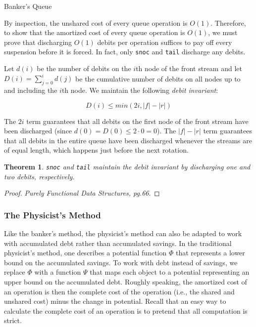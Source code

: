 \documentclass[12pt, a4paper]{article} %
\newtheorem{theorem}{Theorem}[section]     %
\newcommand{\code}[1]{\texttt{#1}} %
\begin{document}
\begin{listing}[H]
  \inputminted[breaklines=true]{haskell}{../../Chapter6/BankersQueue.hs}
  \caption{Banker's Queue}
  \label{lst:banker's queue}
\end{listing}

By inspection, the unshared cost of every queue operation is $O(1)$. Therefore, to show that the amortized cost of every queue operation is $O(1)$, we must prove that discharging $O(1)$ debits per operation suffices to pay off every suspension before it is forced. In fact, only \code{snoc} and \code{tail} discharge any debits.

\newpage

Let $d(i)$ be the number of debits on the $i$th node of the front stream and let $D(i) = \sum_{j = 0}^{i} d(j)$ be the cumulative number of debits on all nodes up to and including the $i$th node. We maintain the following \textit{debit invariant}:

\[
  D(i) \leq min(2i, |f| - |r|)
\]

The $2i$ term guarantees that all debits on the first node of the front stream have been discharged (since $d(0) = D(0) \leq 2 \cdot 0 = 0$). The $|f| - |r|$ term guarantees that all debits in the entire queue have been discharged whenever the streams are of equal length, which happens just before the next rotation.

\begin{theorem}
  \code{snoc} and \code{tail} maintain the debit invariant by discharging one and two debits, respectively.
\end{theorem}

\begin{proof}
  \textit{Purely Functional Data Structures, pg.66}.
\end{proof}

\subsubsection{The Physicist's Method}%

Like the banker's method, the physicist's method can also be adapted to work with accumulated debt rather than accumulated savings. In the traditional physicist's method, one describes a potential function $\Phi$ that represents a lower bound on the accumulated savings. To work with debt instead of savings, we replace $\Phi$ with a function $\Psi$ that maps each object to a potential representing an upper bound on the accumulated debt. Roughly speaking, the amortized cost of an operation is then the complete cost of the operation (i.e., the shared and unshared cost) minus the change in potential. Recall that an easy way to calculate the complete cost of an operation is to pretend that all computation is strict.
\end{document}
